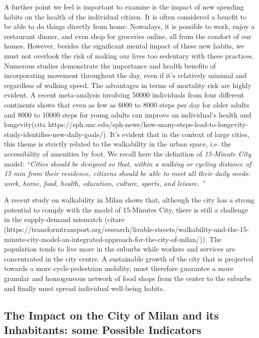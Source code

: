 A further point we feel is important to examine is the impact of new spending habits on the health of the individual citizen. 
It is often considered a benefit to be able to do things directly from home. Nowadays, it is possible to work, enjoy a restaurant dinner, and even shop for groceries online, all from the comfort of our homes. However, besides the significant mental impact of these new habits, we must not overlook the risk of making our lives too sedentary with these practices.
Numerous studies demonstrate the importance and health benefits of incorporating movement throughout the day, even if it's relatively minimal and regardless of walking speed. The advantages in terms of mortality risk are highly evident. A recent meta-analysis involving 50000 individuals from four different continents shows that even as few as 6000 to 8000 steps per day for older adults and 8000 to 10000 steps for young adults can improve an individual's health and longevity(cita https://sph.unc.edu/sph-news/how-many-steps-lead-to-longevity-study-identifies-new-daily-goals/). It's evident that in the context of large cities, this theme is strictly related to the walkability in the urban space, i.e. the accessibility of amenities by foot. We recall here the definition of \textit{15-Minute City} model:
\textit{``Cities should be designed so that, within a walking or cycling distance of 15 min from their residence, citizens should be able to meet all their daily needs: work, home, food, health, education, culture, sports, and leisure. 
''}

A recent study on walkability in Milan shows that, although the city has a strong potential to comply with the model of 15-Minutes City, there is still a challenge in the supply-demand mismatch (citare (https://transformtransport.org/research/livable-streets/walkability-and-the-15-minute-city-model-an-integrated-approach-for-the-city-of-milan/)). The population tends to live more in the suburbs while workers and services are concentrated in the city centre.
A sustainable growth of the city that is projected towards a more cycle-pedestrian mobility, must therefore guarantee a more granular and homogeneous network of food shops from the center to the suburbs and finally must spread individual well-being habits.

\subsection{The Impact on the City of Milan and its Inhabitants: some Possible Indicators}


